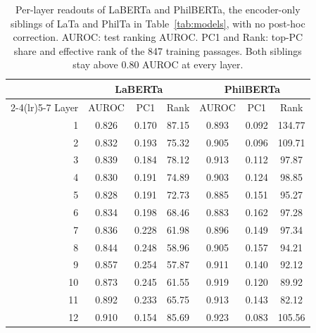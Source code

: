 \begin{table}[t]
\centering
\footnotesize
\setlength{\tabcolsep}{3pt}
\begin{tabular}{@{}rcccccc@{}}
\toprule
& \multicolumn{3}{c}{LaBERTa} & \multicolumn{3}{c}{PhilBERTa} \\
\cmidrule(lr){2-4}\cmidrule(lr){5-7}
Layer & AUROC & PC1 & Rank & AUROC & PC1 & Rank \\
\midrule
1 & 0.826 & 0.170 & 87.15 & 0.893 & 0.092 & 134.77 \\
2 & 0.832 & 0.193 & 75.32 & 0.905 & 0.096 & 109.71 \\
3 & 0.839 & 0.184 & 78.12 & 0.913 & 0.112 & 97.87 \\
4 & 0.830 & 0.191 & 74.89 & 0.903 & 0.124 & 98.85 \\
5 & 0.828 & 0.191 & 72.73 & 0.885 & 0.151 & 95.27 \\
6 & 0.834 & 0.198 & 68.46 & 0.883 & 0.162 & 97.28 \\
7 & 0.836 & 0.228 & 61.98 & 0.896 & 0.149 & 97.34 \\
8 & 0.844 & 0.248 & 58.96 & 0.905 & 0.157 & 94.21 \\
9 & 0.857 & 0.254 & 57.87 & 0.911 & 0.140 & 92.12 \\
10 & 0.873 & 0.245 & 61.55 & 0.919 & 0.120 & 89.92 \\
11 & 0.892 & 0.233 & 65.75 & 0.913 & 0.143 & 82.12 \\
12 & 0.910 & 0.154 & 85.69 & 0.923 & 0.083 & 105.56 \\
\bottomrule
\end{tabular}
\caption{Per-layer readouts of LaBERTa and PhilBERTa, the encoder-only siblings of LaTa and PhilTa in Table~\ref{tab:models}, with no post-hoc correction. AUROC: test ranking AUROC. PC1 and Rank: top-PC share and effective rank of the 847 training passages. Both siblings stay above 0.80 AUROC at every layer.}
\label{tab:p2x2_layerwise}
\end{table}
